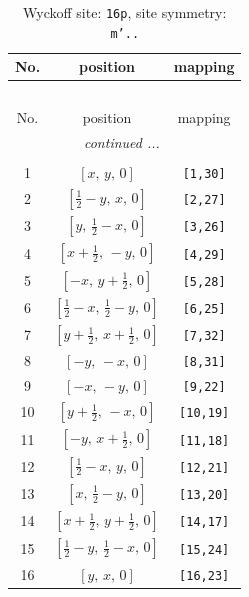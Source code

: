 \documentclass[fleqn,8pt]{jsarticle}
\begin{document}
\begin{longtable}{ccc}
\caption{Wyckoff site: {\tt 16p}, site symmetry: {\tt m'..}}
 \\
 \hline \hline
No. & position & mapping \\ \hline \endfirsthead

\multicolumn{2}{l}{\tablename\ \thetable{}} \\
 \hline \hline
No. & position & mapping \\ \hline \endhead

 \hline \hline
\multicolumn{2}{r}{\footnotesize\it continued ...} \\ \endfoot

 \hline \hline
\multicolumn{2}{r}{} \\ \endlastfoot

1 & $\left[ x,\, y,\, 0 \right]$ & {\tt [1,30]} \\ \hline
2 & $\left[ \frac{1}{2} - y,\, x,\, 0 \right]$ & {\tt [2,27]} \\ \hline
3 & $\left[ y,\, \frac{1}{2} - x,\, 0 \right]$ & {\tt [3,26]} \\ \hline
4 & $\left[ x + \frac{1}{2},\, - y,\, 0 \right]$ & {\tt [4,29]} \\ \hline
5 & $\left[ - x,\, y + \frac{1}{2},\, 0 \right]$ & {\tt [5,28]} \\ \hline
6 & $\left[ \frac{1}{2} - x,\, \frac{1}{2} - y,\, 0 \right]$ & {\tt [6,25]} \\ \hline
7 & $\left[ y + \frac{1}{2},\, x + \frac{1}{2},\, 0 \right]$ & {\tt [7,32]} \\ \hline
8 & $\left[ - y,\, - x,\, 0 \right]$ & {\tt [8,31]} \\ \hline
9 & $\left[ - x,\, - y,\, 0 \right]$ & {\tt [9,22]} \\ \hline
10 & $\left[ y + \frac{1}{2},\, - x,\, 0 \right]$ & {\tt [10,19]} \\ \hline
11 & $\left[ - y,\, x + \frac{1}{2},\, 0 \right]$ & {\tt [11,18]} \\ \hline
12 & $\left[ \frac{1}{2} - x,\, y,\, 0 \right]$ & {\tt [12,21]} \\ \hline
13 & $\left[ x,\, \frac{1}{2} - y,\, 0 \right]$ & {\tt [13,20]} \\ \hline
14 & $\left[ x + \frac{1}{2},\, y + \frac{1}{2},\, 0 \right]$ & {\tt [14,17]} \\ \hline
15 & $\left[ \frac{1}{2} - y,\, \frac{1}{2} - x,\, 0 \right]$ & {\tt [15,24]} \\ \hline
16 & $\left[ y,\, x,\, 0 \right]$ & {\tt [16,23]} \\
\end{longtable}
\end{document}
